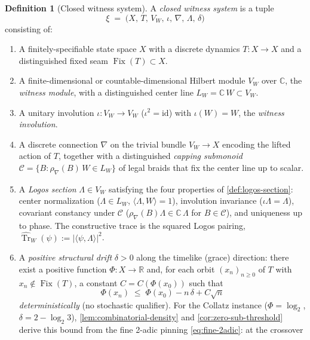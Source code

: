 \documentclass[11pt,a4paper]{article}
\theoremstyle{plain}
\theoremstyle{definition}
\newtheorem{definition}[theorem]{Definition}
\theoremstyle{remark}
\numberwithin{equation}{section}
\newcommand{\Complex}{\mathbb{C}}
\newcommand{\R}{\mathbb{R}}
\DeclareMathOperator{\Tr}{Tr}
\DeclareMathOperator{\Fix}{Fix}
\begin{document}
\begin{definition}[Closed witness system]
\label{def:closed-witness-system}
A \emph{closed witness system} is a tuple
\[
  \xi\;=\;\bigl(X,\,T,\,V_W,\,\iota,\,\nabla,\,\Lambda,\,\delta\bigr)
\]
consisting of:
\begin{enumerate}
  \item[\textup{(W1)}] A finitely-specifiable state space $X$ with
        a discrete dynamics $T:X\to X$ and a distinguished fixed
        seam $\Fix(T)\subset X$.
  \item[\textup{(W2)}] A finite-dimensional or
        countable-dimensional Hilbert module $V_W$ over $\Complex$,
        the \emph{witness module}, with a distinguished center
        line $L_W=\Complex\,W\subset V_W$.
  \item[\textup{(W3)}] A unitary involution
        $\iota:V_W\to V_W$ ($\iota^2=\mathrm{id}$) with
        $\iota(W)=W$, the \emph{witness involution}.
  \item[\textup{(W4)}] A discrete connection $\nabla$ on the
        trivial bundle $V_W\to X$ encoding the lifted action of
        $T$, together with a distinguished \emph{capping
        submonoid} $\mathcal{C}=\{B:\rho_\nabla(B)\,W\in L_W\}$
        of legal braids that fix the center line up to scalar.
  \item[\textup{(W5)}] A \emph{Logos section} $\Lambda\in V_W$
        satisfying the four properties of
        \cref{def:logos-section}: center normalization
        ($\Lambda\in L_W$, $\langle\Lambda,W\rangle=1$),
        involution invariance ($\iota\Lambda=\Lambda$),
        covariant constancy under $\mathcal{C}$
        ($\rho_\nabla(B)\Lambda\in\Complex\,\Lambda$ for
        $B\in\mathcal{C}$), and uniqueness up to phase.  The
        constructive trace is the squared Logos pairing,
        $\widehat{\Tr}_W(\psi):=|\langle\psi,\Lambda\rangle|^2$.
  \item[\textup{(W6)}] A \emph{positive structural drift}
        $\delta>0$ along the timelike (grace) direction: there
        exist a positive function
        $\Phi:X\to\R$ and, for each orbit
        $(x_n)_{n\ge 0}$ of $T$ with $x_n\notin\Fix(T)$, a
        constant $C=C(\Phi(x_0))$ such that
        \[
          \Phi(x_n) \;\le\; \Phi(x_0) - n\,\delta + C\sqrt{n}
        \]
        \emph{deterministically} (no stochastic qualifier).  For the
        Collatz instance ($\Phi=\log_2$, $\delta=2-\log_2 3$),
        \cref{lem:combinatorial-density} and
        \cref{cor:zero-sub-threshold} derive this bound from the
        fine 2-adic pinning \eqref{eq:fine-2adic}: at the crossover

\end{enumerate}
\end{definition}
\end{document}

